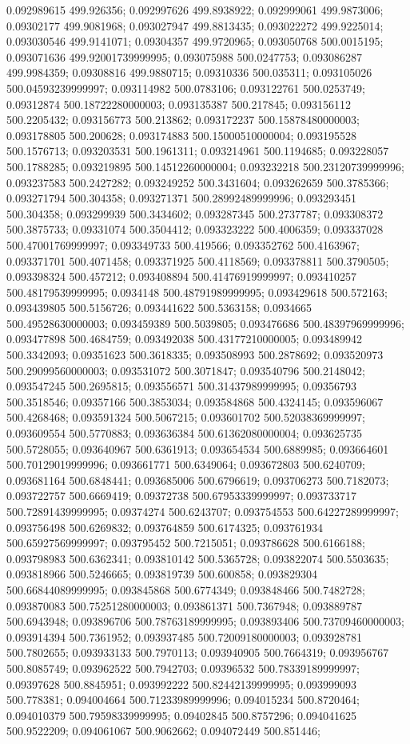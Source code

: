 0.092989615 499.926356; 0.092997626 499.8938922; 0.092999061 499.9873006; 0.09302177 499.9081968; 0.093027947 499.8813435; 0.093022272 499.9225014; 0.093030546 499.9141071; 0.09304357 499.9720965; 0.093050768 500.0015195; 0.093071636 499.92001739999995; 0.093075988 500.0247753; 0.093086287 499.9984359; 0.09308816 499.9880715; 0.09310336 500.035311; 0.093105026 500.04593239999997; 0.093114982 500.0783106; 0.093122761 500.0253749; 0.09312874 500.18722280000003; 0.093135387 500.217845; 0.093156112 500.2205432; 0.093156773 500.213862; 0.093172237 500.15878480000003; 0.093178805 500.200628; 0.093174883 500.15000510000004; 0.093195528 500.1576713; 0.093203531 500.1961311; 0.093214961 500.1194685; 0.093228057 500.1788285; 0.093219895 500.14512260000004; 0.093232218 500.23120739999996; 0.093237583 500.2427282; 0.093249252 500.3431604; 0.093262659 500.3785366; 0.093271794 500.304358; 0.093271371 500.28992489999996; 0.093293451 500.304358; 0.093299939 500.3434602; 0.093287345 500.2737787; 0.093308372 500.3875733; 0.09331074 500.3504412; 0.093323222 500.4006359; 0.093337028 500.47001769999997; 0.093349733 500.419566; 0.093352762 500.4163967; 0.093371701 500.4071458; 0.093371925 500.4118569; 0.093378811 500.3790505; 0.093398324 500.457212; 0.093408894 500.41476919999997; 0.093410257 500.48179539999995; 0.0934148 500.48791989999995; 0.093429618 500.572163; 0.093439805 500.5156726; 0.093441622 500.5363158; 0.0934665 500.49528630000003; 0.093459389 500.5039805; 0.093476686 500.48397969999996; 0.093477898 500.4684759; 0.093492038 500.43177210000005; 0.093489942 500.3342093; 0.09351623 500.3618335; 0.093508993 500.2878692; 0.093520973 500.29099560000003; 0.093531072 500.3071847; 0.093540796 500.2148042; 0.093547245 500.2695815; 0.093556571 500.31437989999995; 0.09356793 500.3518546; 0.09357166 500.3853034; 0.093584868 500.4324145; 0.093596067 500.4268468; 0.093591324 500.5067215; 0.093601702 500.52038369999997; 0.093609554 500.5770883; 0.093636384 500.61362080000004; 0.093625735 500.5728055; 0.093640967 500.6361913; 0.093654534 500.6889985; 0.093664601 500.70129019999996; 0.093661771 500.6349064; 0.093672803 500.6240709; 0.093681164 500.6848441; 0.093685006 500.6796619; 0.093706273 500.7182073; 0.093722757 500.6669419; 0.09372738 500.67953339999997; 0.093733717 500.72891439999995; 0.09374274 500.6243707; 0.093754553 500.64227289999997; 0.093756498 500.6269832; 0.093764859 500.6174325; 0.093761934 500.65927569999997; 0.093795452 500.7215051; 0.093786628 500.6166188; 0.093798983 500.6362341; 0.093810142 500.5365728; 0.093822074 500.5503635; 0.093818966 500.5246665; 0.093819739 500.600858; 0.093829304 500.66844089999995; 0.093845868 500.6774349; 0.093848466 500.7482728; 0.093870083 500.75251280000003; 0.093861371 500.7367948; 0.093889787 500.6943948; 0.093896706 500.78763189999995; 0.093893406 500.73709460000003; 0.093914394 500.7361952; 0.093937485 500.72009180000003; 0.093928781 500.7802655; 0.093933133 500.7970113; 0.093940905 500.7664319; 0.093956767 500.8085749; 0.093962522 500.7942703; 0.09396532 500.78339189999997; 0.09397628 500.8845951; 0.093992222 500.82442139999995; 0.093999093 500.778381; 0.094004664 500.71233989999996; 0.094015234 500.8720464; 0.094010379 500.79598339999995; 0.09402845 500.8757296; 0.094041625 500.9522209; 0.094061067 500.9062662; 0.094072449 500.851446; 